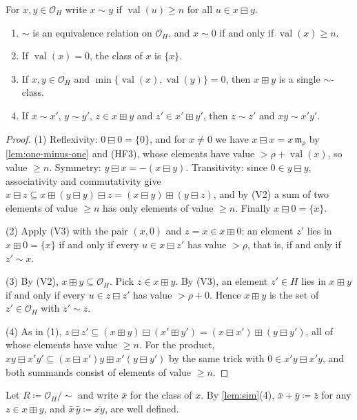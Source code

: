 \documentclass[11pt]{amsart}
\numberwithin{equation}{section}
\newcommand{\hplus}{\boxplus}
\newcommand{\hminus}{\boxminus}
\newcommand{\val}{\operatorname{val}}
\newcommand{\m}{\mathfrak m}
\begin{document}
\begin{lemma}\label{lem:sim}
For $x,y\in\mathcal O_H$ write $x\sim y$ if $\val(u)\ge n$ for all $u\in x\hminus y$.
\begin{enumerate}
\item $\sim$ is an equivalence relation on $\mathcal O_H$, and $x\sim0$ if and only if $\val(x)\ge n$.
\item If $\val(x)=0$, the class of $x$ is $\{x\}$.
\item If $x,y\in\mathcal O_H$ and $\min\{\val(x),\val(y)\}=0$, then $x\hplus y$ is a single $\sim$-class.
\item If $x\sim x'$, $y\sim y'$, $z\in x\hplus y$ and $z'\in x'\hplus y'$, then $z\sim z'$ and $xy\sim x'y'$.
\end{enumerate}
\end{lemma}

\begin{proof}
(1) Reflexivity: $0\hminus0=\{0\}$, and for $x\ne0$ we have $x\hminus x=x\,\m_\rho$ by \cref{lem:one-minus-one} and (HF3), whose elements have value $>\rho+\val(x)$, so value $\ge n$. Symmetry: $y\hminus x=-(x\hminus y)$. Transitivity: since $0\in y\hminus y$, associativity and commutativity give $x\hminus z\subseteq x\hplus(y\hminus y)\hminus z=(x\hminus y)\hplus(y\hminus z)$, and by (V2) a sum of two elements of value $\ge n$ has only elements of value $\ge n$. Finally $x\hminus0=\{x\}$.

(2) Apply (V3) with the pair $(x,0)$ and $z=x\in x\hplus0$: an element $z'$ lies in $x\hplus0=\{x\}$ if and only if every $u\in x\hminus z'$ has value $>\rho$, that is, if and only if $z'\sim x$.

(3) By (V2), $x\hplus y\subseteq\mathcal O_H$. Pick $z\in x\hplus y$. By (V3), an element $z'\in H$ lies in $x\hplus y$ if and only if every $u\in z\hminus z'$ has value $>\rho+0$. Hence $x\hplus y$ is the set of $z'\in\mathcal O_H$ with $z'\sim z$.

(4) As in (1), $z\hminus z'\subseteq(x\hplus y)\hminus(x'\hplus y')=(x\hminus x')\hplus(y\hminus y')$, all of whose elements have value $\ge n$. For the product, $xy\hminus x'y'\subseteq (x\hminus x')y\hplus x'(y\hminus y')$ by the same trick with $0\in x'y\hminus x'y$, and both summands consist of elements of value $\ge n$.
\end{proof}

Let $R\coloneqq\mathcal O_H/{\sim}$ and write $\bar x$ for the class of $x$. By \cref{lem:sim}(4), $\bar x+\bar y\coloneqq\bar z$ for any $z\in x\hplus y$, and $\bar x\,\bar y\coloneqq\overline{xy}$, are well defined.
\end{document}

